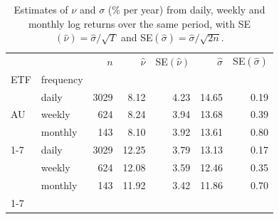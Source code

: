 \begin{table}
\caption{Estimates of $\nu$ and $\sigma$ (\% per year) from daily, weekly and monthly log returns over the same period, with SE$(\hat\nu)=\hat\sigma/\sqrt{T}$ and SE$(\hat\sigma)=\hat\sigma/\sqrt{2n}$.}
\label{tab:frequency}
\begin{tabular}{llrrrrr}
\toprule
 &  & $n$ & $\hat\nu$ & SE$(\hat\nu)$ & $\hat\sigma$ & SE$(\hat\sigma)$ \\
ETF & frequency &  &  &  &  &  \\
\midrule
\multirow[t]{3}{*}{AU} & daily & 3029 & 8.12 & 4.23 & 14.65 & 0.19 \\
 & weekly & 624 & 8.24 & 3.94 & 13.68 & 0.39 \\
 & monthly & 143 & 8.10 & 3.92 & 13.61 & 0.80 \\
\cline{1-7}
\multirow[t]{3}{*}{GL} & daily & 3029 & 12.25 & 3.79 & 13.13 & 0.17 \\
 & weekly & 624 & 12.08 & 3.59 & 12.46 & 0.35 \\
 & monthly & 143 & 11.92 & 3.42 & 11.86 & 0.70 \\
\cline{1-7}
\bottomrule
\end{tabular}
\end{table}
